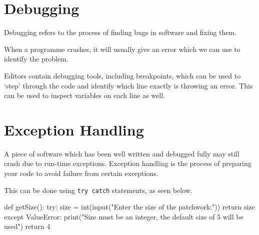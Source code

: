 
\section*{Debugging}
Debugging refers to the process of finding bugs in software and fixing them. 

When a programme crashes, it will usually give an error which we can use to identify the problem.

Editors contain debugging tools, including breakpoints, which can be used to `step' through the code and identify which line exactly is throwing an error. This can be used to inspect variables on each line as well.

\section*{Exception Handling}
A piece of software which has been well written and debugged fully may still crash due to run-time exceptions. Exception handling is the process of preparing your code to avoid failure from certain exceptions. 

This can be done using \texttt{try catch} statements, as seen below.
\begin{python}
def getSize():
    try: 
        size = int(input("Enter the size of the patchwork:"))
        return size 
    except ValueError:
        print("Size must be an integer, the default size of 5 will be used") 
        return 4
\end{python}
